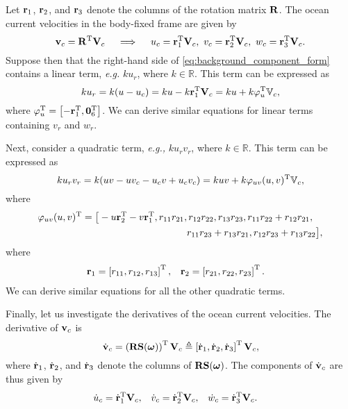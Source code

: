 Let $\mathbf{r}_1$, $\mathbf{r}_2$, and $\mathbf{r}_3$ denote the columns of the rotation matrix $\mathbf{R}$.
The ocean current velocities in the body-fixed frame are given by
\begin{equation}
    \mathbf{v}_c = \mathbf{R}^{\mathrm{T}} \mathbf{V}_c \quad \implies \quad
    u_c = \mathbf{r}_1^{\mathrm{T}} \mathbf{V}_c, \,\,
    v_c = \mathbf{r}_2^{\mathrm{T}} \mathbf{V}_c, \,\,
    w_c = \mathbf{r}_3^{\mathrm{T}} \mathbf{V}_c.
\end{equation}
Suppose then that the right-hand side of \eqref{eq:background_component_form} contains a linear term, \emph{e.g.} $k u_r$, where $k \in \mathbb{R}$.
This term can be expressed as
\begin{equation}
    k u_r = k (u - u_c) = k u - k \mathbf{r}_1^{\mathrm{T}} \mathbf{V}_c
    = k u + k \varphi_u^{\mathrm{T}} \mathbb{V}_c,
\end{equation}
where $\varphi_u^{\mathrm{T}} = \left[-\mathbf{r}_1^{\mathrm{T}}, \mathbf{0}_6^{\mathrm{T}}\right]$.
We can derive similar equations for linear terms containing $v_r$ and $w_r$.

Next, consider a quadratic term, \emph{e.g.,} $k u_r v_r$, where $k \in \mathbb{R}$.
This term can be expressed as
\begin{equation}
    k u_r v_r = k (uv - uv_c - u_cv + u_cv_c) = k u v + k \varphi_{uv}(u,v)^{\mathrm{T}} \mathbb{V}_c,
\end{equation}
where
\begin{align}
    \varphi_{uv}(u,v)^{\mathrm{T}} = \big[-u\mathbf{r}_2^{\mathrm{T}}-v\mathbf{r}_1^{\mathrm{T}}, r_{11}r_{21}, &\,r_{12}r_{22}, r_{13}r_{23}, r_{11}r_{22}+r_{12}r_{21}, \\
    &r_{11}r_{23}+r_{13}r_{21}, r_{12}r_{23}+r_{13}r_{22}\big], \nonumber
\end{align}
where
\begin{align}
    \mathbf{r}_1 &= \left[r_{11}, r_{12}, r_{13}\right]^{\mathrm{T}}, &
    \mathbf{r}_2 &= \left[r_{21}, r_{22}, r_{23}\right]^{\mathrm{T}}.
\end{align}
We can derive similar equations for all the other quadratic terms.

Finally, let us investigate the derivatives of the ocean current velocities.
The derivative of $\mathbf{v}_c$ is
\begin{equation}
    \dot{\mathbf{v}}_c = \left(\mathbf{R}\mathbf{S}(\bm{\omega})\right)^{\mathrm{T}} \mathbf{V}_c \triangleq \left[\dot{\mathbf{r}}_1, \dot{\mathbf{r}}_2, \dot{\mathbf{r}}_3\right]^{\mathrm{T}} \mathbf{V}_c,
\end{equation}
where $\dot{\mathbf{r}}_1$, $\dot{\mathbf{r}}_2$, and $\dot{\mathbf{r}}_3$ denote the columns of $\mathbf{R}\mathbf{S}(\bm{\omega})$.
The components of $\dot{\mathbf{v}}_c$ are thus given by
\begin{align}
    \dot{u}_c &= \dot{\mathbf{r}}_1^{\mathrm{T}} \mathbf{V}_c, &
    \dot{v}_c &= \dot{\mathbf{r}}_2^{\mathrm{T}} \mathbf{V}_c, &
    \dot{w}_c &= \dot{\mathbf{r}}_3^{\mathrm{T}} \mathbf{V}_c.
\end{align}

